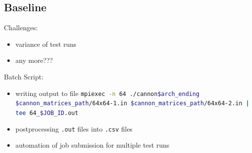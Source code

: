 \documentclass[9pt,pdftex]{beamer}
\begin{document}
\subsection{Baseline}
\begin{frame}{\insertsubsection}
\begin{block}{Challenges:}
\begin{itemize}
	\item variance of test runs
	\item any more???
\end{itemize}
\end{block}

\begin{block}{Batch Script:}
\begin{itemize}
	\item writing output to file
		\lstinline[language=bash]{mpiexec -n 64 ./cannon$arch_ending $cannon_matrices_path/64x64-1.in $cannon_matrices_path/64x64-2.in | tee 64_$JOB_ID.out}
	\item postprocessing \lstinline{.out} files into \lstinline{.csv} files
	\item automation of job submission for multiple test runs	
\end{itemize}
\end{block}

\end{frame}
\end{document}
